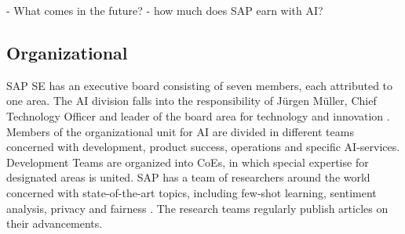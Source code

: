 	- What comes in the future?
	- how much does SAP earn with AI?
	
	\subsection{Organizational}
	SAP SE has an executive board consisting of seven members, each attributed to one area. The \ac{AI} division falls into the responsibility of Jürgen Müller, Chief Technology Officer and leader of the board area for technology and innovation \cite{JuergenMuellerBiography}.
	Members of the organizational unit for \ac{AI} are divided in different teams concerned with development, product success, operations and specific \ac{AI}-services. Development Teams are organized into \acp{CoE}, in which special expertise for designated areas is united.
	SAP has a team of researchers around the world concerned with state-of-the-art topics, including few-shot learning, sentiment analysis, privacy and fairness \cite{AIOverviewResearch}. The research teams regularly publish articles on their advancements.
